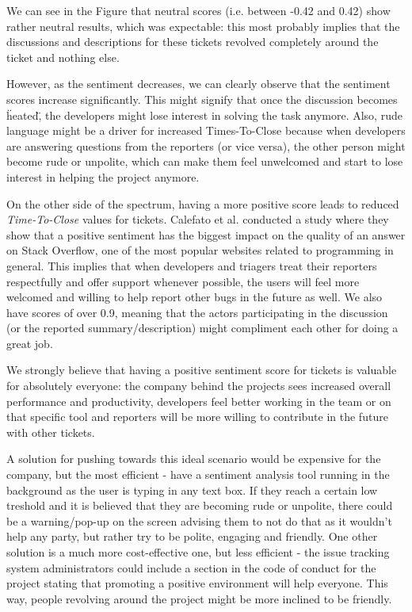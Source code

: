 \documentclass{mpaper}
\begin{document}
We can see in the Figure that neutral scores (i.e. between -0.42 and 0.42) show rather neutral results, which 
was expectable: this most probably implies that the discussions and descriptions for these tickets revolved 
completely around the ticket and nothing else. 

However, as the sentiment decreases, we can clearly observe that the sentiment scores increase significantly. 
This might signify that once the discussion becomes \"heated\", the developers might lose interest in solving 
the task anymore. Also, rude language might be a driver for increased Times-To-Close because when developers are 
answering questions from the reporters (or vice versa), the other person might become rude or unpolite, which can 
make them feel unwelcomed and start to lose interest in helping the project anymore. 

On the other side of the spectrum, having a more positive score leads to reduced \emph{Time-To-Close} values for tickets. Calefato et al. 
\cite{calefato2015mining} conducted a study where they show that a positive sentiment has the biggest impact on 
the quality of an answer on Stack Overflow, one of the most popular websites related to programming in general. This 
implies that when developers and triagers treat their reporters respectfully and offer support whenever possible, 
the users will feel more welcomed and willing to help report other bugs in the future as well. We also have scores of 
over 0.9, meaning that the actors participating in the discussion (or the reported summary/description) might compliment 
each other for doing a great job.

We strongly believe that having a positive sentiment score for tickets is valuable for absolutely everyone: the company
behind the projects sees increased overall performance and productivity, developers feel better working in the team or
on that specific tool and reporters will be more willing to contribute in the future with other tickets.

A solution for pushing towards this ideal scenario would be expensive for the company, but the most efficient - have a 
sentiment analysis tool running in the background as the user is typing in any text box. If they reach a certain low 
treshold and it is believed that they are becoming rude or unpolite, there could be a warning/pop-up on the screen advising 
them to not do that as it wouldn't help any party, but rather try to be polite, engaging and friendly. One other solution
is a much more cost-effective one, but less efficient - the issue tracking system administrators could include a section 
in the code of conduct for the project stating that promoting a positive environment will help everyone. This way, people 
revolving around the project might be more inclined to be friendly.
\end{document}

